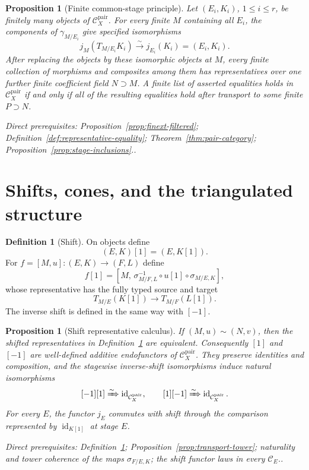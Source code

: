 \documentclass[10pt]{article}
\newtheorem{proposition}[theorem]{Proposition}
\theoremstyle{definition}
\newtheorem{definition}[theorem]{Definition}
\newcommand{\Pair}{\mathcal C_X^{\mathrm{pair}}}
\newcommand{\depends}[1]{\par\smallskip\noindent\textit{Direct prerequisites:} #1.}
\begin{document}
\begin{proposition}[Finite common-stage principle]\label{prop:finite-stage-principle}
Let $(E_i,K_i)$, $1\leq i\leq r$, be finitely many objects of $\Pair$.
For every finite $M$ containing all $E_i$, the components of
$\gamma_{M/E_i}$ give specified isomorphisms
\[
 j_M(T_{M/E_i}K_i)\xrightarrow{\sim}j_{E_i}(K_i)=(E_i,K_i).
\]
After replacing the objects by these isomorphic objects at $M$, every
finite collection of morphisms and composites among them has
representatives over one further finite coefficient field $N\supset M$.  A finite list
of asserted equalities holds in $\Pair$ if and only if all of the resulting
equalities hold after transport to some finite $P\supset N$.
\depends{Proposition~\ref{prop:finext-filtered};
Definition~\ref{def:representative-equality}; Theorem~\ref{thm:pair-category};
Proposition~\ref{prop:stage-inclusions}.}
\end{proposition}

\section{Shifts, cones, and the triangulated structure}

\begin{definition}[Shift]\label{def:pair-shift}
On objects define
\[
 (E,K)[1]=(E,K[1]).
\]
For $f=[M,u]:(E,K)\to(F,L)$ define
\[
 f[1]=
 \left[M,\,
 \sigma_{M/F,L}^{-1}\circ u[1]\circ\sigma_{M/E,K}
 \right],
\]
whose representative has the fully typed source and target
\[
 T_{M/E}(K[1])\longrightarrow T_{M/F}(L[1]).
\]
The inverse shift is defined in the same way with $[-1]$.
\end{definition}

\begin{proposition}[Shift representative calculus]\label{prop:pair-shift-calculus}
If $(M,u)\sim(N,v)$, then the shifted representatives in
Definition~\ref{def:pair-shift} are equivalent.  Consequently $[1]$ and
$[-1]$ are well-defined additive endofunctors of $\Pair$.  They preserve
identities and composition, and the stagewise inverse-shift isomorphisms
induce natural isomorphisms
\[
 [-1][1]\xRightarrow{\sim}\operatorname{id}_{\Pair},
 \qquad
 [1][-1]\xRightarrow{\sim}\operatorname{id}_{\Pair}.
\]
For every $E$, the functor $j_E$ commutes with shift through the comparison
represented by $\operatorname{id}_{K[1]}$ at stage $E$.
\depends{Definition~\ref{def:pair-shift};
Proposition~\ref{prop:transport-tower}; naturality and tower coherence of
the maps $\sigma_{F/E,K}$; the shift functor laws in every $\mathcal C_E$.}
\end{proposition}
\end{document}
